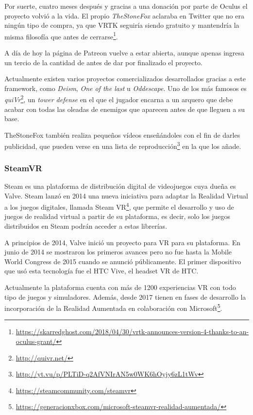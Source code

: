 Por suerte, cuatro meses después y gracias a una donación por parte de Oculus el proyecto volvió a la vida. El propio \textit{TheStoneFox} aclaraba en Twitter que no era ningún tipo de compra, ya que \acs{VRTK} seguiría siendo gratuito y mantendría la misma filosofía que antes de cerrarse\footnote{\url{https://skarredghost.com/2018/04/30/vrtk-announces-version-4-thanks-to-an-oculus-grant/}}.

A día de hoy la página de Patreon vuelve a estar abierta, aunque apenas ingresa un tercio de la cantidad de antes de dar por finalizado el proyecto.

Actualmente existen varios proyectos comercializados desarrollados gracias a este framework, como \textit{Deism}, \textit{One of the last} u \textit{Oddescape}. Uno de los más famosos es \textit{quiVr}\footnote{\url{http://quivr.net/}}, un \textit{tower defense} en el que el jugador encarna a un arquero que debe acabar con todas las oleadas de enemigos que aparecen antes de que lleguen a su base.

TheStoneFox también realiza pequeños vídeos enseñándoles con el fin de darles publicidad, que pueden verse en una lista de reproducción\footnote{\url{http://yt.vu/p/PLTiD-q2AfVNIrAN5w0WK6hOyjy6zL1tWv}} en la que los añade. 

\subsubsection{SteamVR}

Steam es una plataforma de distribución digital de videojuegos cuya dueña es Valve. Steam lanzó en 2014 una nueva iniciativa para adaptar la Realidad Virtual a los juegos digitales, llamada Steam VR\footnote{\url{https://steamcommunity.com/steamvr}}, que permite el desarrollo y uso de juegos de realidad virtual a partir de su plataforma, es decir, solo los juegos distribuidos en Steam podrán acceder a estas librerías.

A principios de  2014, Valve inició un proyecto para \acs{VR} para su plataforma. En junio de 2014 se mostraron los primeros avances pero no fue hasta la Mobile World Congress de 2015 cuando se anunció públicamente. El primer dispositivo que usó esta tecnología fue el HTC Vive, el headset \acs{VR} de HTC.

Actualmente la plataforma cuenta con más de 1200 experiencias \acs{VR} con todo tipo de juegos y simuladores. Además, desde 2017 tienen en fases de desarrollo la incorporación de la Realidad Aumentada en colaboración con Microsoft\footnote{\url{https://generacionxbox.com/microsoft-steamvr-realidad-aumentada/}}.

